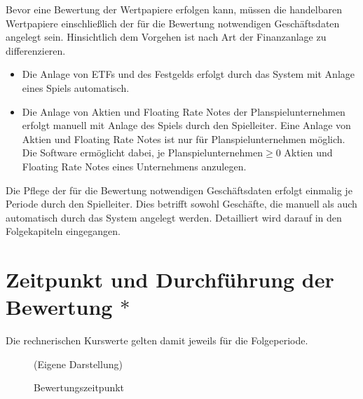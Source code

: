 \documentclass[12pt, a4paper]{article}
\begin{document}
Bevor eine Bewertung der Wertpapiere erfolgen kann, müssen die handelbaren Wertpapiere einschließlich der für die Bewertung notwendigen Geschäftsdaten angelegt sein. Hinsichtlich dem Vorgehen ist nach Art der Finanzanlage zu differenzieren.
\begin{itemize}
	\item Die Anlage von {ETFs} und des Festgelds erfolgt durch das System mit Anlage eines Spiels automatisch. 
	\item Die Anlage von Aktien und Floating Rate Notes der Planspielunternehmen erfolgt manuell mit Anlage des Spiels durch den Spielleiter. Eine Anlage von Aktien und Floating Rate Notes ist nur für Planspielunternehmen möglich. Die Software ermöglicht dabei, je Planspielunternehmen$\geq 0$ Aktien und Floating Rate Notes eines Unternehmens anzulegen. 
\end{itemize}
Die Pflege der für die Bewertung notwendigen Geschäftsdaten erfolgt einmalig je Periode durch den Spielleiter. Dies betrifft sowohl Geschäfte, die manuell als auch automatisch durch das System angelegt werden. Detailliert wird darauf in den Folgekapiteln eingegangen.

\section{Zeitpunkt und Durchführung der Bewertung $\ast$}
\label{sec:zeitpunkt_und_durchfuehrung_der_bewertung}


Die rechnerischen Kurswerte gelten damit jeweils für die Folgeperiode.

\begin{figure}[htb]
	\centering
	\caption{Bewertungszeitpunkt}
	\label{img:zeitstrahl_var}
	(Eigene Darstellung)
\end{figure}
\end{document}
